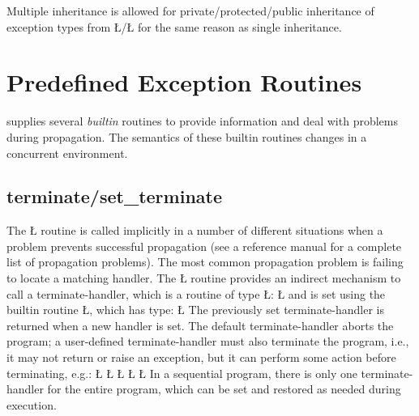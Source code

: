 \documentclass[openright,twoside]{report}
\begin{document}
Multiple inheritance is allowed for private/protected/public inheritance of exception types from \LGinlinetrue\LGbegin\lgrinde\L{}\endlgrinde\LGend{}/\LGinlinetrue\LGbegin\lgrinde\L{}\endlgrinde\LGend{} for the same reason as single inheritance.


\section{Predefined Exception Routines}

\CC supplies several \emph{builtin} routines to provide information and deal with problems during propagation.
The semantics of these builtin routines changes in a concurrent environment.


\subsection{\texorpdfstring{{\BGfont terminate}/{\BGfont set\_terminate}}{terminate/set\_terminate}}
\label{s:set_terminate}

The \LGinlinetrue\LGbegin\lgrinde\L{}\endlgrinde\LGend{} routine is called implicitly in a number of different situations when a problem prevents successful propagation (see a \CC reference manual for a complete list of propagation problems).
The most common propagation problem is failing to locate a matching handler.
The \LGinlinetrue\LGbegin\lgrinde\L{}\endlgrinde\LGend{} routine provides an indirect mechanism to call a terminate-handler, which is a routine of type \LGinlinetrue\LGbegin\lgrinde\L{}\endlgrinde\LGend{}:
\LGinlinefalse\LGbegin\lgrinde
\L{}
\endlgrinde\LGend
and is set using the builtin routine \LGinlinetrue\LGbegin\lgrinde\L{}\endlgrinde\LGend{}, which has type:
\LGinlinefalse\LGbegin\lgrinde
\L{}
\endlgrinde\LGend
The previously set terminate-handler is returned when a new handler is set.
The default terminate-handler aborts the program;
a user-defined terminate-handler must also terminate the program, i.e., it may not return or raise an exception, but it can perform some action before terminating, e.g.:
\LGinlinefalse\LGbegin\lgrinde
\L{}
\L{\LB{}}
\CE{}\L{\LB{}}
\CE{}\L{\LB{\}}}
\L{}
\endlgrinde\LGend
In a sequential program, there is only one terminate-handler for the entire program, which can be set and restored as needed during execution.
\end{document}
